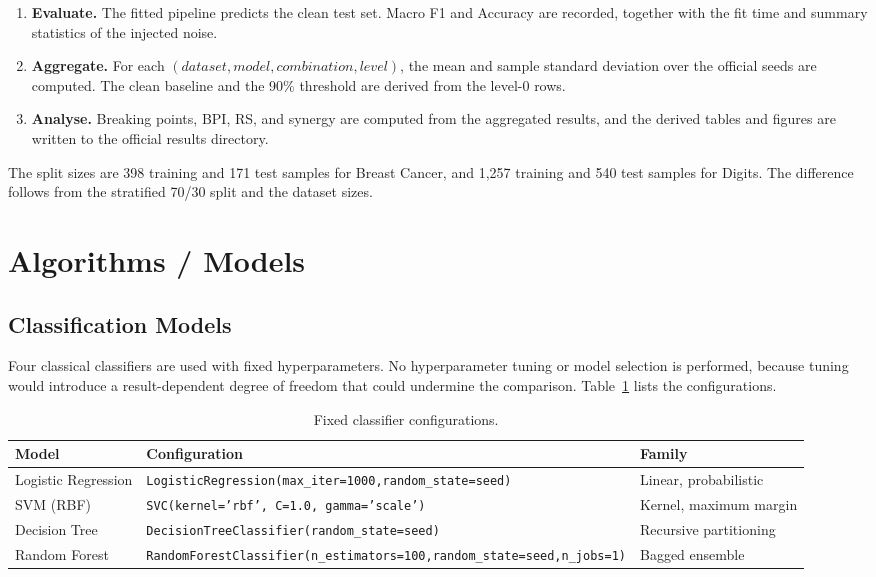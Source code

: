 \begin{enumerate}
  \item \textbf{Evaluate.} The fitted pipeline predicts the clean test set. Macro F1 and Accuracy are recorded, together with the fit time and summary statistics of the injected noise.
  \item \textbf{Aggregate.} For each $(dataset, model, combination, level)$, the mean and sample standard deviation over the official seeds are computed. The clean baseline and the 90\% threshold are derived from the level-0 rows.
  \item \textbf{Analyse.} Breaking points, BPI, RS, and synergy are computed from the aggregated results, and the derived tables and figures are written to the official results directory.
\end{enumerate}

The split sizes are 398 training and 171 test samples for Breast Cancer, and 1,257 training and 540 test samples for Digits. The difference follows from the stratified 70/30 split and the dataset sizes.

\section{Algorithms / Models}

\subsection{Classification Models}

Four classical classifiers are used with fixed hyperparameters. No hyperparameter tuning or model selection is performed, because tuning would introduce a result-dependent degree of freedom that could undermine the comparison. Table~\ref{tab:models} lists the configurations.

\begin{table}[H]
\centering
\caption{Fixed classifier configurations.}
\label{tab:models}
\small
\begin{tabular}{p{3.2cm}p{6.2cm}p{3.8cm}}
\toprule
\textbf{Model} & \textbf{Configuration} & \textbf{Family} \\
\midrule
Logistic Regression & \texttt{LogisticRegression(}\newline\texttt{max\_iter=1000,}\newline\texttt{random\_state=seed)} & Linear, probabilistic \\
SVM (RBF) & \texttt{SVC(kernel='rbf', C=1.0, gamma='scale')} & Kernel, maximum margin \\
Decision Tree & \texttt{DecisionTreeClassifier(}\newline\texttt{random\_state=seed)} & Recursive partitioning \\
Random Forest & \texttt{RandomForestClassifier(}\newline\texttt{n\_estimators=100,}\newline\texttt{random\_state=seed,}\newline\texttt{n\_jobs=1)} & Bagged ensemble \\
\bottomrule
\end{tabular}
\end{table}


